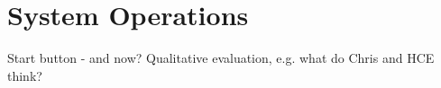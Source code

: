 \chapter{System Operations}

Start button - and now?
Qualitative evaluation, e.g. what do Chris and HCE think?
